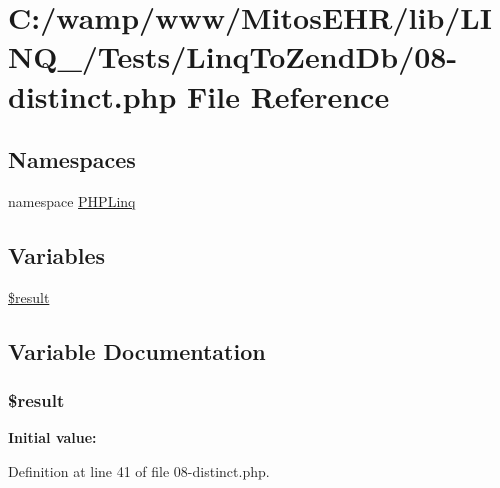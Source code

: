 \hypertarget{_linq_to_zend_db_208-distinct_8php}{\section{\-C\-:/wamp/www/\-Mitos\-E\-H\-R/lib/\-L\-I\-N\-Q\-\_/\-Tests/\-Linq\-To\-Zend\-Db/08-\/distinct.php \-File \-Reference}
\label{_linq_to_zend_db_208-distinct_8php}
}
\subsection*{\-Namespaces}
\begin{DoxyCompactItemize}
\item 
namespace \hyperlink{namespace_p_h_p_linq}{\-P\-H\-P\-Linq}
\end{DoxyCompactItemize}
\subsection*{\-Variables}
\begin{DoxyCompactItemize}
\item 
\hyperlink{_linq_to_zend_db_208-distinct_8php_a112ef069ddc0454086e3d1e6d8d55d07}{\$result}
\end{DoxyCompactItemize}


\subsection{\-Variable \-Documentation}
\hypertarget{_linq_to_zend_db_208-distinct_8php_a112ef069ddc0454086e3d1e6d8d55d07}{
\subsubsection[{\$result}]{\setlength{\rightskip}{0pt plus 5cm}\$result}}\label{_linq_to_zend_db_208-distinct_8php_a112ef069ddc0454086e3d1e6d8d55d07}
{\bfseries \-Initial value\-:}


\-Definition at line 41 of file 08-\/distinct.\-php.

